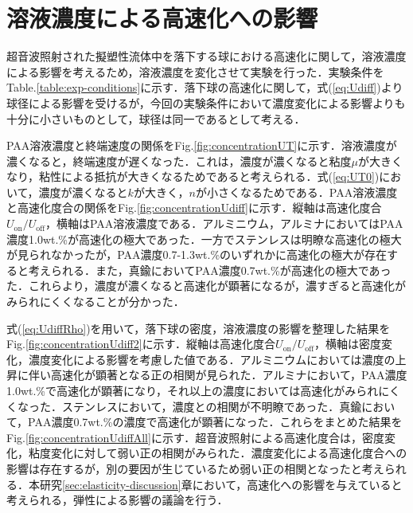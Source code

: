 \section{溶液濃度による高速化への影響}
\label{sec:concentration}
超音波照射された擬塑性流体中を落下する球における高速化に関して，溶液濃度による影響を考えるため，溶液濃度を変化させて実験を行った．実験条件をTable.\ref{table:exp-conditions}に示す．落下球の高速化に関して，式(\ref{eq:Udiff})より球径による影響を受けるが，今回の実験条件において濃度変化による影響よりも十分に小さいものとして，球径は同一であるとして考える．

PAA溶液濃度と終端速度の関係をFig.\ref{fig:concentrationUT}に示す．溶液濃度が濃くなると，終端速度が遅くなった．これは，濃度が濃くなると粘度$\mu$が大きくなり，粘性による抵抗が大きくなるためであると考えられる．式(\ref{eq:UT0})において，濃度が濃くなると$k$が大きく，$n$が小さくなるためである．PAA溶液濃度と高速化度合の関係をFig.\ref{fig:concentrationUdiff}に示す．縦軸は高速化度合$U_\text{on}/U_\text{off}$，横軸はPAA溶液濃度である．アルミニウム，アルミナにおいてはPAA濃度1.0wt.\%が高速化の極大であった．一方でステンレスは明瞭な高速化の極大が見られなかったが，PAA濃度0.7-1.3wt.\%のいずれかに高速化の極大が存在すると考えられる．また，真鍮においてPAA濃度0.7wt.\%が高速化の極大であった．これらより，濃度が濃くなると高速化が顕著になるが，濃すぎると高速化がみられにくくなることが分かった．

式(\ref{eq:UdiffRho})を用いて，落下球の密度，溶液濃度の影響を整理した結果をFig.\ref{fig:concentrationUdiff2}に示す．縦軸は高速化度合$U_\text{on}/U_\text{off}$，横軸は密度変化，濃度変化による影響を考慮した値である．アルミニウムにおいては濃度の上昇に伴い高速化が顕著となる正の相関が見られた．アルミナにおいて，PAA濃度1.0wt.\%で高速化が顕著になり，それ以上の濃度においては高速化がみられにくくなった．ステンレスにおいて，濃度との相関が不明瞭であった．真鍮において，PAA濃度0.7wt.\%の濃度で高速化が顕著になった．これらをまとめた結果をFig.\ref{fig:concentrationUdiffAll}に示す．超音波照射による高速化度合は，密度変化，粘度変化に対して弱い正の相関がみられた．濃度変化による高速化度合への影響は存在するが，別の要因が生じているため弱い正の相関となったと考えられる．本研究\ref{sec:elasticity-discussion}章において，高速化への影響を与えていると考えられる，弾性による影響の議論を行う．

